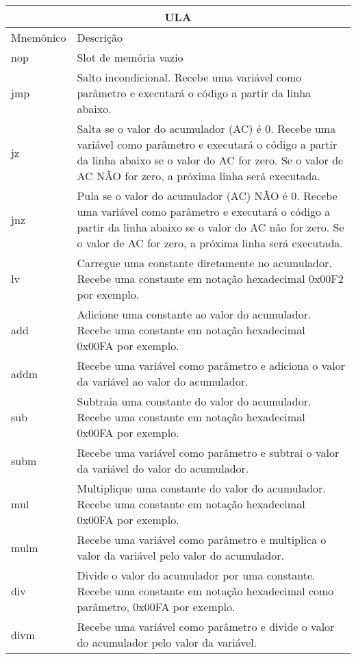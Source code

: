 \vspace{1cm}
\begin{longtable}{ |p{3cm}||p{11cm}|  }
  \hline
  \multicolumn{2}{|c|}{ULA} \\
  \hline
  Mnemônico &
  Descrição\\
  \hline
  nop &
  Slot de memória vazio \\
  \hline
  jmp &
  Salto incondicional. Recebe uma variável como parâmetro e executará o código a partir da linha abaixo. \\
  \hline
  jz &
  Salta se o valor do acumulador (AC) é 0. Recebe uma variável como parâmetro e executará o código a partir da linha abaixo se o valor do AC for zero. Se o valor de AC NÃO for zero, a próxima linha será executada. \\
  \hline
  jnz &
  Pula se o valor do acumulador (AC) NÃO é 0. Recebe uma variável como parâmetro e executará o código a partir da linha abaixo se o valor do AC não for zero. Se o valor de AC for zero, a próxima linha será executada. \\
  \hline
  lv &
  Carregue uma constante diretamente no acumulador. Recebe uma constante em notação hexadecimal 0x00F2 por exemplo. \\
  \hline
  add &
  Adicione uma constante ao valor do acumulador. Recebe uma constante em notação hexadecimal 0x00FA por exemplo. \\
  \hline
  addm &
  Recebe uma variável como parâmetro e adiciona o valor da variável ao valor do acumulador. \\
  \hline
  sub &
  Subtraia uma constante do valor do acumulador. Recebe uma constante em notação hexadecimal 0x00FA por exemplo. \\
  \hline
  subm &
  Recebe uma variável como parâmetro e subtrai o valor da variável do valor do acumulador. \\
  \hline
  mul &
  Multiplique uma constante do valor do acumulador. Recebe uma constante em notação hexadecimal 0x00FA por exemplo. \\
  \hline
  mulm &
  Recebe uma variável como parâmetro e multiplica o valor da variável pelo valor do acumulador. \\
  \hline
  div &
  Divide o valor do acumulador por uma constante. Recebe uma constante em notação hexadecimal como parâmetro, 0x00FA por exemplo. \\
  \hline
  divm &
  Recebe uma variável como parâmetro e divide o valor do acumulador pelo valor da variável. \\
  \hline

\end{longtable}
